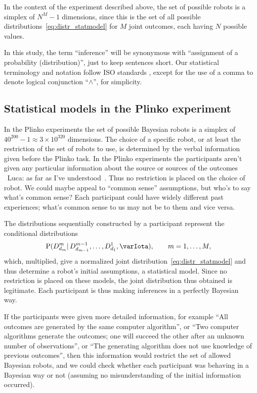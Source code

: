 \documentclass[\ifafour a4paper,12pt,\else a5paper,10pt,\fi%
onecolumn,oneside,article,%
british%
]{memoir}
\theoremstyle{remark}
\theoremstyle{innote}
\newcommand*{\citep}{\parencites}
\newcommand*{\p}{\mathrm{P}}%
\renewcommand*{\|}{\mathpunct{|}}
\newcommand*{\puzzle}{\maltese}
\newcommand{\mynote}[1]{ {\color{notecolour}\puzzle\ #1\ }}
\newcommand*{\yI}{\varIota}
\begin{document}
In the context of the experiment described above, the set of possible
robots is a simplex of $N^M-1$ dimensions, since this is the set of all
possible distributions~\eqref{eq:distr_statmodel} for $M$ joint outcomes,
each having $N$ possible values.

In this study, the term \enquote{inference} will be synonymous with
\enquote{assignment of a probability (distribution)}, just to keep
sentences short. Our statistical terminology and notation follow ISO
standards \citep{iso1993_r2009,iso2006}, except for the use of a comma to
denote logical conjunction \enquote{$\land$}, for simplicity.

\subsection{Statistical models in the Plinko experiment}
\label{sec:plinko_statmodels}

In the Plinko experiments \citep{filipowiczetal2014,filipowiczetal2016} the
set of possible Bayesian robots is a simplex of
$40^{200}-1 \approx 3\times10^{320}$ dimensions. The choice of a specific
robot, or at least the restriction of the set of robots to use, is
determined by the verbal information given before the Plinko task. In the
Plinko experiments the participants aren't given any particular information
about the source or sources of the outcomes \mynote{Luca: as far as I've
  understood}. Thus no restriction is placed on the choice of robot. We
could maybe appeal to \enquote{common sense} assumptions, but who's to say
what's common sense? Each participant could have widely different past
experiences; what's common sense to us may not be to them and vice versa.

The distributions sequentially constructed by a participant represent the
conditional distributions
\begin{equation}
  \p(D^m_{d_m} \| D^{m-1}_{d_{m-1}},\dotsc,D^1_{d_1},\yI),
  \qquad m=1,\dotsc,M,
\label{eq:cond_distribs}
\end{equation}
which, multiplied, give a normalized joint
distribution~\eqref{eq:distr_statmodel} and thus determine a robot's
initial assumptions, a statistical model. Since no restriction is placed on
these models, the joint distribution thus obtained is legitimate. Each
participant is thus making inferences in a perfectly Bayesian way.

If the participants were given more detailed information, for example
\enquote{All outcomes are generated by the same computer algorithm}, or
\enquote{Two computer algorithms generate the outcomes; one will succeed
  the other after an unknown number of observations}, or \enquote{The
  generating algorithm does not use knowledge of previous outcomes}, then
this information would restrict the set of allowed Bayesian robots, and we
could check whether each participant was behaving in a Bayesian way or not
(assuming no misunderstanding of the initial information occurred).
\end{document}
